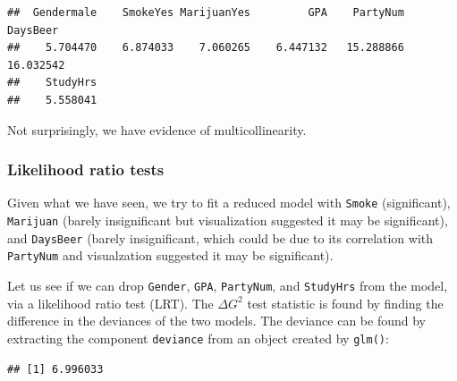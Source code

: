 \documentclass[
]{book}
\newenvironment{Shaded}{\begin{snugshade}}{\end{snugshade}}
\newcommand{\AttributeTok}[1]{\textcolor[rgb]{0.13,0.29,0.53}{#1}}
\newcommand{\DocumentationTok}[1]{\textcolor[rgb]{0.56,0.35,0.01}{\textbf{\textit{#1}}}}
\newcommand{\FunctionTok}[1]{\textcolor[rgb]{0.13,0.29,0.53}{\textbf{#1}}}
\newcommand{\NormalTok}[1]{#1}
\newcommand{\OtherTok}[1]{\textcolor[rgb]{0.56,0.35,0.01}{#1}}
\newcommand{\SpecialCharTok}[1]{\textcolor[rgb]{0.81,0.36,0.00}{\textbf{#1}}}
\begin{document}
\begin{verbatim}
##  Gendermale    SmokeYes MarijuanYes         GPA    PartyNum    DaysBeer 
##    5.704470    6.874033    7.060265    6.447132   15.288866   16.032542 
##    StudyHrs 
##    5.558041
\end{verbatim}

Not surprisingly, we have evidence of multicollinearity.

\hypertarget{likelihood-ratio-tests}{%
\subsubsection*{Likelihood ratio tests}\label{likelihood-ratio-tests}}

Given what we have seen, we try to fit a reduced model with \texttt{Smoke} (significant), \texttt{Marijuan} (barely insignificant but visualization suggested it may be significant), and \texttt{DaysBeer} (barely insignificant, which could be due to its correlation with \texttt{PartyNum} and visualzation suggested it may be significant).

Let us see if we can drop \texttt{Gender}, \texttt{GPA}, \texttt{PartyNum}, and \texttt{StudyHrs} from the model, via a likelihood ratio test (LRT). The \(\Delta G^2\) test statistic is found by finding the difference in the deviances of the two models. The deviance can be found by extracting the component \texttt{deviance} from an object created by \texttt{glm()}:

\begin{Shaded}
\end{Shaded}

\begin{verbatim}
## [1] 6.996033
\end{verbatim}
\end{document}
